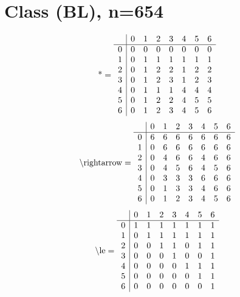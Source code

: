 \documentclass[11pt]{article}
\begin{document}
\section{Class (BL), n=654}
\[\text{*} = 
\begin{array}{r | r r r r r r r}
 & 0 & 1 & 2 & 3 & 4 & 5 & 6 \\ \hline
0 & 0 & 0 & 0 & 0 & 0 & 0 & 0 \\
1 & 0 & 1 & 1 & 1 & 1 & 1 & 1 \\
2 & 0 & 1 & 2 & 2 & 1 & 2 & 2 \\
3 & 0 & 1 & 2 & 3 & 1 & 2 & 3 \\
4 & 0 & 1 & 1 & 1 & 4 & 4 & 4 \\
5 & 0 & 1 & 2 & 2 & 4 & 5 & 5 \\
6 & 0 & 1 & 2 & 3 & 4 & 5 & 6 \\
\end{array}
\]
\[\text{\textbackslash rightarrow} = 
\begin{array}{r | r r r r r r r}
 & 0 & 1 & 2 & 3 & 4 & 5 & 6 \\ \hline
0 & 6 & 6 & 6 & 6 & 6 & 6 & 6 \\
1 & 0 & 6 & 6 & 6 & 6 & 6 & 6 \\
2 & 0 & 4 & 6 & 6 & 4 & 6 & 6 \\
3 & 0 & 4 & 5 & 6 & 4 & 5 & 6 \\
4 & 0 & 3 & 3 & 3 & 6 & 6 & 6 \\
5 & 0 & 1 & 3 & 3 & 4 & 6 & 6 \\
6 & 0 & 1 & 2 & 3 & 4 & 5 & 6 \\
\end{array}
\]
\[\text{\textbackslash le} = 
\begin{array}{r | r r r r r r r}
 & 0 & 1 & 2 & 3 & 4 & 5 & 6 \\ \hline
0 & 1 & 1 & 1 & 1 & 1 & 1 & 1 \\
1 & 0 & 1 & 1 & 1 & 1 & 1 & 1 \\
2 & 0 & 0 & 1 & 1 & 0 & 1 & 1 \\
3 & 0 & 0 & 0 & 1 & 0 & 0 & 1 \\
4 & 0 & 0 & 0 & 0 & 1 & 1 & 1 \\
5 & 0 & 0 & 0 & 0 & 0 & 1 & 1 \\
6 & 0 & 0 & 0 & 0 & 0 & 0 & 1 \\
\end{array}
\]
\end{document}
